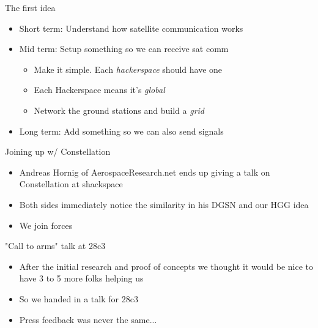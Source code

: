 	\begin{frame}{The first idea}
		\begin{itemize}
			\item Short term: Understand how satellite communication works
			\item Mid term: Setup something so we can receive sat comm
				\begin{itemize}
					\item Make it simple. Each \emph{hackerspace} should have one
					\item Each Hackerspace means it's \emph{global}
					\item Network the ground stations and build a \emph{grid}
				\end{itemize}
			\item Long term: Add something so we can also send signals
		\end{itemize}
	\end{frame}

	\begin{frame}{Joining up w/ Constellation}
		\begin{itemize}
			\item Andreas Hornig of AerospaceResearch.net ends up giving a talk on Constellation at shackspace
			\item Both sides immediately notice the similarity in his DGSN and our HGG idea
			\item We join forces
		\end{itemize}
	\end{frame}

	\begin{frame}{"Call to arms" talk at 28c3}
		\begin{itemize}
			\item After the initial research and proof of concepts we thought it would be nice to have 3 to 5 more folks helping us
			\item So we handed in a talk for 28c3
			\item Press feedback was never the same...
		\end{itemize}
	\end{frame}

